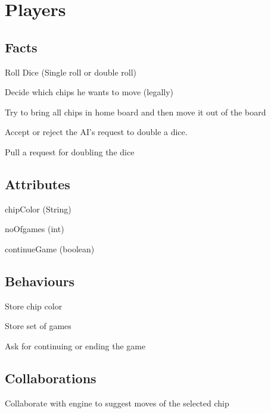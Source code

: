 \documentclass{report}
\begin{document}
















\section{Players}

\subsection{Facts}

\begin{dashed}
    \item Roll Dice (Single roll or double roll)
    \item Decide which chips he wants to move (legally)
    \item Try to bring all chips in home board and then move it out of the board
    \item Accept or reject the AI's request to double a dice.
    \item Pull a request for doubling the dice
\end{dashed}

\subsection{Attributes}

    \begin{dashed}
        \item chipColor (String)
        \item noOfgames (int)
        \item continueGame (boolean)
    \end{dashed}

\subsection{Behaviours}

    \begin{dashed}
        \item Store chip color
        \item Store set of games
        \item Ask for continuing or ending the game
    \end{dashed}

\subsection{Collaborations}

    \begin{dashed}
        \item Collaborate with engine to suggest moves of the selected chip
    \end{dashed}
\end{document}
